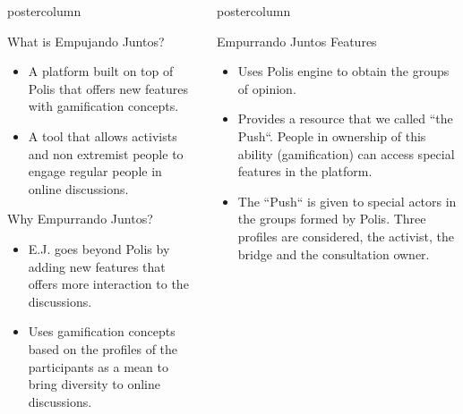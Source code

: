 \documentclass[final,hyperref={pdfpagelabels=false}]{beamer}
\newlength{\columnheight}
\begin{document}
\begin{frame}
\begin{columns}
\begin{column}{.49\textwidth}
\begin{beamercolorbox}[center,wd=\textwidth]{postercolumn}
\begin{minipage}[T]{.95\textwidth}
{\begin{block}{What is Empujando Juntos?}
\begin{itemize}
    \item A platform built on top of Polis that offers new features
    with gamification concepts.

    \item A tool that allows activists and non extremist people to engage regular
    people in online discussions.
  \end{itemize}
\end{block}

\begin{block}{Why Empurrando Juntos?}
  \begin{itemize}
    \item E.J. goes beyond Polis by adding new features that offers more interaction
    to the discussions.

    \item Uses gamification concepts based on the profiles of the participants as
    a mean to bring diversity to online discussions.
  \end{itemize}
\end{block}


}
\end{minipage}
\end{beamercolorbox}
\end{column}

\begin{column}{.49\textwidth}
  \begin{beamercolorbox}[center,wd=\textwidth]{postercolumn}
    \begin{minipage}[T]{.95\textwidth} %
      \parbox[t][\columnheight]{\textwidth}{ %

\begin{block}{Empurrando Juntos Features}
  \begin{itemize}
    \item Uses Polis engine to obtain the groups of opinion.

    \item Provides a resource that we called ``the Push``. People in ownership of
    this ability (gamification) can access special features in the platform.

    \item The ``Push`` is given to special actors in the groups formed by Polis.
    Three profiles are considered, the activist, the bridge and the consultation
    owner.


\end{itemize}
\end{block}}
\end{minipage}
\end{beamercolorbox}
\end{column}
\end{columns}
\end{frame}
\end{document}
